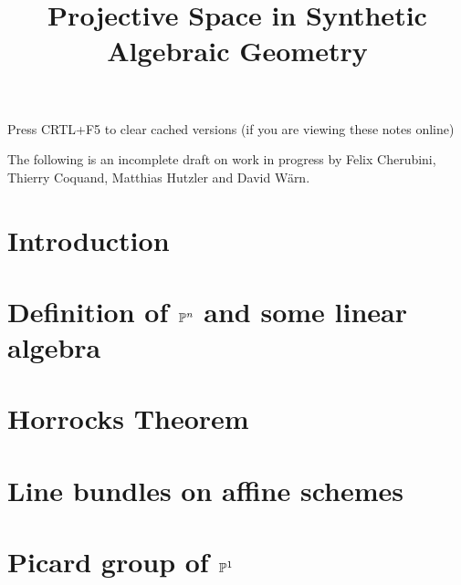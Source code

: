 \documentclass{../util/zariski}
\title{Projective Space in Synthetic Algebraic Geometry}
\begin{document}
\maketitle

\begin{center}
  \color{purple}
  \large{Press CRTL+F5 to clear cached versions}
  \large{(if you are viewing these notes online)}
\end{center}

The following is an incomplete draft on work in progress
by Felix Cherubini, Thierry Coquand, Matthias Hutzler and David Wärn.

 \section*{Introduction}



\section[Definition of projective space and some linear algebra]{Definition of $\mathbb{P}^n$ and some linear algebra}




\section{Horrocks Theorem}



\section{Line bundles on affine schemes}



\section[Picard group of projective space]{Picard group of $\mathbb{P}^1$}



\newpage



\printindex

\printbibliography
\end{document}
